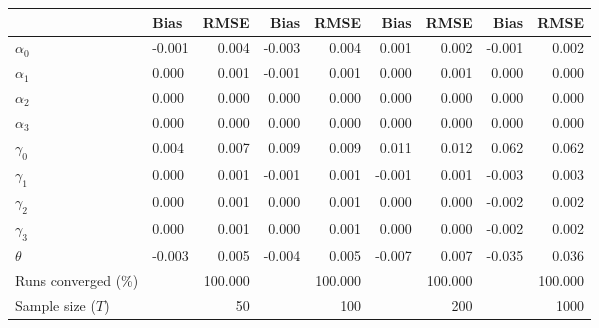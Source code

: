 
\begin{tabular}[t]{llrrrrrrr}
\toprule
  & Bias & RMSE & Bias & RMSE & Bias & RMSE & Bias & RMSE\\
\midrule
$\alpha_{0}$ & -0.001 & 0.004 & -0.003 & 0.004 & 0.001 & 0.002 & -0.001 & 0.002\\
$\alpha_{1}$ & 0.000 & 0.001 & -0.001 & 0.001 & 0.000 & 0.001 & 0.000 & 0.000\\
$\alpha_{2}$ & 0.000 & 0.000 & 0.000 & 0.000 & 0.000 & 0.000 & 0.000 & 0.000\\
$\alpha_{3}$ & 0.000 & 0.000 & 0.000 & 0.000 & 0.000 & 0.000 & 0.000 & 0.000\\
$\gamma_{0}$ & 0.004 & 0.007 & 0.009 & 0.009 & 0.011 & 0.012 & 0.062 & 0.062\\
$\gamma_{1}$ & 0.000 & 0.001 & -0.001 & 0.001 & -0.001 & 0.001 & -0.003 & 0.003\\
$\gamma_{2}$ & 0.000 & 0.001 & 0.000 & 0.001 & 0.000 & 0.000 & -0.002 & 0.002\\
$\gamma_{3}$ & 0.000 & 0.001 & 0.000 & 0.001 & 0.000 & 0.000 & -0.002 & 0.002\\
$\theta$ & -0.003 & 0.005 & -0.004 & 0.005 & -0.007 & 0.007 & -0.035 & 0.036\\
Runs converged (\%) &  & 100.000 &  & 100.000 &  & 100.000 &  & 100.000\\
Sample size ($T$) &  & 50 &  & 100 &  & 200 &  & 1000\\
\bottomrule
\end{tabular}
